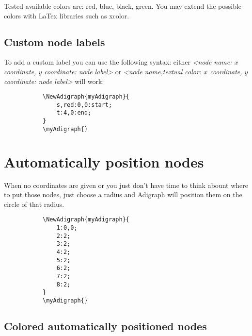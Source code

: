\documentclass{report}
\begin{document}
Tested available colors are: red, blue, black, green. You may extend the possible colors with LaTex libraries such as xcolor.

\subsection{Custom node labels}
To add a custom label you can use the following syntax: either \textit{<node name: \(x\) coordinate, \(y\) coordinate: node label>} or \textit{<node name,textual color: \(x\) coordinate, \(y\) coordinate: node label>} will work:

\begin{figure}
	\begin{subfigure}{0.49\textwidth}
		\begin{verbatim}
\NewAdigraph{myAdigraph}{
 	s,red:0,0:start;
 	t:4,0:end;
}
\myAdigraph{}
\end{verbatim}
	\end{subfigure}
	\begin{subfigure}{0.49\textwidth}
		\myAdigraph{}
	\end{subfigure}
\end{figure}

\section{Automatically position nodes}
When no coordinates are given or you just don't have time to think abount where to put those nodes, just choose a radius and Adigraph will position them on the circle of that radius.

\begin{figure}
	\begin{subfigure}{0.49\textwidth}
		\begin{verbatim}
\NewAdigraph{myAdigraph}{
	1:0,0;
	2:2;
	3:2;
	4:2;
	5:2;
	6:2;
	7:2;
	8:2;
}
\myAdigraph{}
\end{verbatim}
	\end{subfigure}
	\begin{subfigure}{0.49\textwidth}
		\myAdigraph{}
	\end{subfigure}
\end{figure}

\subsection{Colored automatically positioned nodes}
\end{document}
